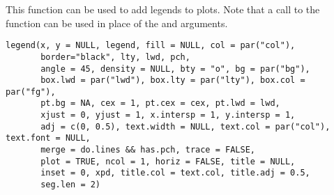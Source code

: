 %
\begin{Description}\relax
This function can be used to add legends to plots.  Note that a call
to the function  can be used in place of the 
and  arguments.
\end{Description}
%
\begin{Usage}
\begin{verbatim}
legend(x, y = NULL, legend, fill = NULL, col = par("col"),
       border="black", lty, lwd, pch,
       angle = 45, density = NULL, bty = "o", bg = par("bg"),
       box.lwd = par("lwd"), box.lty = par("lty"), box.col = par("fg"),
       pt.bg = NA, cex = 1, pt.cex = cex, pt.lwd = lwd,
       xjust = 0, yjust = 1, x.intersp = 1, y.intersp = 1,
       adj = c(0, 0.5), text.width = NULL, text.col = par("col"), text.font = NULL,
       merge = do.lines && has.pch, trace = FALSE,
       plot = TRUE, ncol = 1, horiz = FALSE, title = NULL,
       inset = 0, xpd, title.col = text.col, title.adj = 0.5,
       seg.len = 2)
\end{verbatim}
\end{Usage}
%

